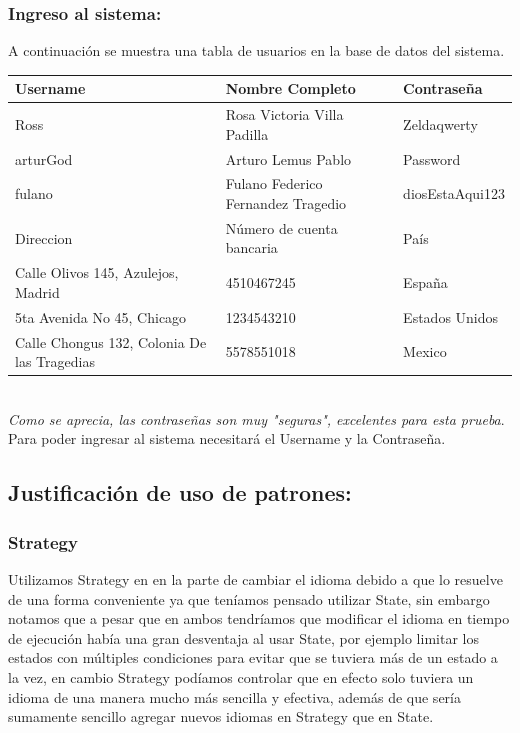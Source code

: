 \documentclass{article}
\begin{document}
\subsubsection*{Ingreso al sistema:}
A continuación se muestra una tabla de usuarios en la base de datos del sistema.
\begin{table}[h]
  \begin{tabular}{|l|l|l|}
  \hline
  \rowcolor[HTML]{C0C0C0} 
  {\color[HTML]{000000} Username}             & {\color[HTML]{000000} Nombre Completo} & {\color[HTML]{000000} Contraseña} \\ \hline
  Ross                                        & Rosa Victoria Villa Padilla            & Zeldaqwerty                       \\ \hline
  arturGod                                    & Arturo Lemus Pablo                     & Password                          \\ \hline
  fulano                                      & Fulano Federico Fernandez Tragedio     & diosEstaAqui123                   \\ \hline
  \rowcolor[HTML]{C0C0C0} 
  Direccion                                   & Número de cuenta bancaria              & País                              \\ \hline
  Calle Olivos 145, Azulejos, Madrid          & 4510467245                             & España                            \\ \hline
  5ta Avenida No 45, Chicago                  & 1234543210                             & Estados Unidos                    \\ \hline
  Calle Chongus 132, Colonia De las Tragedias & 5578551018                             & Mexico                            \\ \hline
  \end{tabular}
  \end{table}\\
  \textit{Como se aprecia, las contraseñas son muy "seguras", excelentes para esta prueba}.\\
  Para poder ingresar al sistema necesitará el Username y la Contraseña.
  


\newpage
\subsection*{Justificación de uso de patrones:}
\subsubsection*{Strategy}
Utilizamos Strategy en en la parte de cambiar el idioma debido a que lo resuelve
de una forma conveniente ya que teníamos pensado utilizar State, sin embargo notamos
que a pesar que en ambos tendríamos que modificar el idioma en tiempo de ejecución
había una gran desventaja al usar State, por ejemplo limitar los estados con múltiples
condiciones para evitar que se tuviera más de un estado a la vez, en cambio Strategy
podíamos controlar que en efecto solo tuviera un idioma de una manera mucho más sencilla
y efectiva, además de que sería sumamente sencillo agregar nuevos idiomas en Strategy
que en State.
\end{document}

